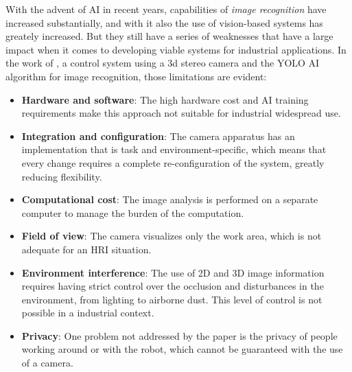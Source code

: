 \noindent With the advent of AI in recent years, capabilities of \textit{image recognition} have increased substantially, and with it also the use of vision-based systems has greately increased.
But they still have a series of weaknesses that have a large impact when it comes to developing viable systems for industrial applications.
In the work of \cite{s25206402}, a control system using a 3d stereo camera and the YOLO AI algorithm for image recognition, those limitations are evident:
\begin{itemize}
	\item \textbf{Hardware and software}: The high hardware cost and AI training requirements make this approach not suitable for industrial widespread use.
	\item \textbf{Integration and configuration}: The camera apparatus has an implementation that is task and environment-specific, which means that every change requires a complete re-configuration of the system, greatly reducing flexibility.
	\item \textbf{Computational cost}: The image analysis is performed on a separate computer to manage the burden of the computation.
	\item \textbf{Field of view}: The camera visualizes only the work area, which is not adequate for an HRI situation.
	\item \textbf{Environment interference}: The use of 2D and 3D image information requires having strict control over the occlusion and disturbances in the environment, from lighting to airborne dust. This level of control is not possible in a industrial context. 
	\item \textbf{Privacy}: One problem not addressed by the paper is the privacy of people working around or with the robot, which cannot be guaranteed with the use of a camera.
\end{itemize}

